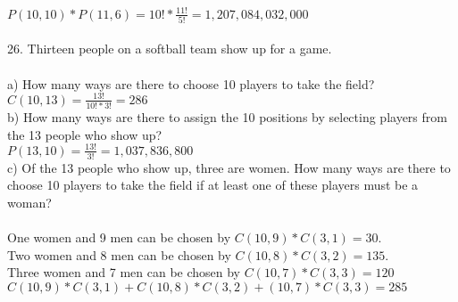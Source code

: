 \documentclass[11pt, oneside]{article}   	%
\begin{document}
$P(10,10) * P(11,6) = 10! * \frac{11!}{5!} = 1,207,084,032,000$\\\\
26. Thirteen people on a softball team show up for a game.\\\\
a) How many ways are there to choose 10 players to take the field?\\
$C(10,13) = \frac{13!}{10! * 3!} = 286$\\
b) How many ways are there to assign the 10 positions by selecting players from the 13 people who show up?\\
$P(13,10) = \frac{13!}{3!} = 1,037,836,800$\\
c) Of the 13 people who show up, three are women. How many ways are there to choose 10 players to take the field if at least one of these players must be a woman?\\\\
One women and 9 men can be chosen by $C(10,9) * C(3,1) = 30$.\\
Two women and 8 men can be chosen by $C(10,8) * C(3,2) = 135$.\\
Three women and 7 men can be chosen by $C(10,7) * C(3,3) = 120$\\
$C(10,9) * C(3,1) + C(10,8) * C(3,2) + (10,7) * C(3,3) = 285$
\end{document}
